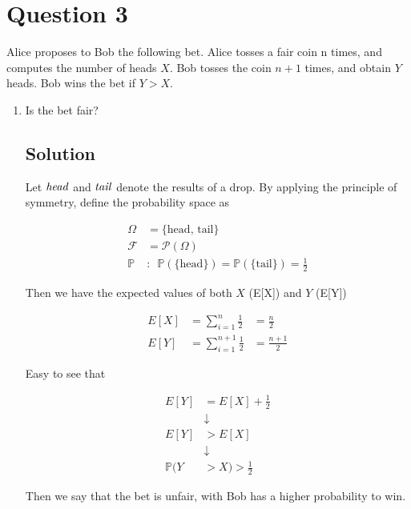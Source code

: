\documentclass[12pt]{article}
\newcommand{\bP}{\mathbb{P}}
\begin{document}
	
	\section*{Question 3}
	
	\noindent Alice proposes to Bob the following bet. Alice tosses a fair coin n times, and computes the number of heads $X$. Bob tosses the coin $n+1$ times, and obtain $Y$ heads. Bob wins the bet if $Y > X$.
	
	\bigskip
	
	\begin{enumerate}[start=1,label={\bfseries Part \arabic*:},leftmargin=0in]
		\bigskip\item Is the bet fair?
		
		\subsection*{Solution}
		
			Let $\it{head}$ and $\it{tail}$ denote the results of a drop. By applying the principle of symmetry, define the probability space as
			
			\[
			\begin{aligned}
				\Omega &= \{\mathrm{head},\,\mathrm{tail}\}\\
				\mathcal{F} &= \mathcal{P}(\Omega)\\
				\bP &:\enspace \bP(\{\text{head}\}) = \bP(\{\text{tail}\}) = \frac{1}{2}
			\end{aligned}
			\]
			
			Then we have the expected values of both $X$ (E[X]) and $Y$ (E[Y])
			
			\[
			\begin{aligned}
				E[X] &= \sum_{i=1}^n\frac{1}{2} &= \frac{n}{2}\\
				E[Y] &= \sum_{i=1}^{n+1}\frac{1}{2} &= \frac{n+1}{2}
			\end{aligned}
			\]
			
			Easy to see that
			
			\[
			\begin{aligned}
				E[Y] &= E[X] + \frac{1}{2}\\
				&\downarrow\\
				E[Y] &> E[X]\\
				&\downarrow\\
				\bP(Y&>X) > \frac{1}{2}
			\end{aligned}
			\]
			
			Then we say that the bet is unfair, with Bob has a higher probability to win.
		

\end{enumerate}
\end{document}
